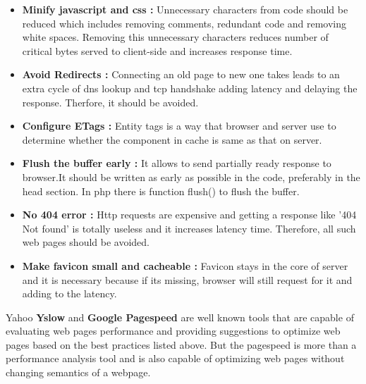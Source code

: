 \documentclass[conference]{IEEEtran}
\begin{document}
\begin{itemize}
\item \textbf{ Minify javascript and css :}
Unnecessary characters from code should be reduced which includes removing
comments, redundant code and removing white spaces. Removing this unnecessary
characters reduces number of critical bytes served to client-side and increases response time.

\item \textbf{Avoid Redirects :}
Connecting an old page to new one takes leads to an extra cycle of dns lookup and tcp handshake adding latency
and delaying the response. Therfore, it should be avoided.

\item \textbf{Configure ETags :}
Entity tags is a way that browser and server use to determine whether the
component in cache is same as that on server.

\item \textbf{Flush the buffer early :}
It allows to send partially ready response to browser.It should be written as
early as possible in the code, preferably in the head section.
In php there is function flush() to flush the buffer. 

\item \textbf{No 404 error :}
Http requests are expensive and getting a response like '404 Not found' is totally useless
and it increases latency time. Therefore, all such web pages should be avoided.

\item \textbf{Make favicon small and cacheable :}
Favicon stays in the core of server and  it is necessary because if its missing,
browser will still request for it and adding to the latency.
\end{itemize}

Yahoo {\bf Yslow}\cite{yslow} and {\bf Google Pagespeed}\cite{gps} are well known tools that are capable of
evaluating web pages performance and providing suggestions to optimize web pages
based on the best practices listed above. But the pagespeed is more than a performance analysis
tool and is also capable of optimizing web pages without changing semantics of a webpage.
\end{document}
